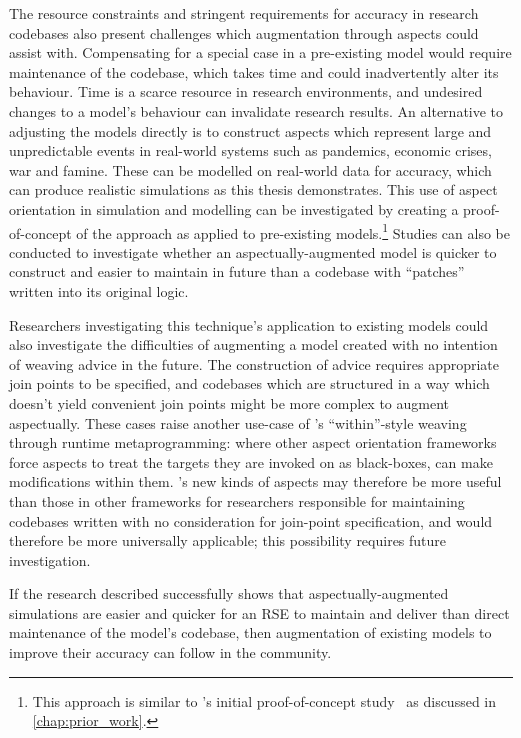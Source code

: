 The resource constraints and stringent requirements for accuracy in research
codebases also present challenges which augmentation through aspects could
assist with. Compensating for a special case in a pre-existing model would
require maintenance of the codebase, which takes time and could inadvertently
alter its behaviour. Time is a scarce resource in research environments, and
undesired changes to a model's behaviour can invalidate research results. An
alternative to adjusting the models directly is to construct aspects which
represent large and unpredictable events in real-world systems such as
pandemics, economic crises, war and famine. These can be modelled on real-world
data for accuracy, which can produce realistic simulations as this thesis
demonstrates. This use of aspect orientation in simulation and modelling can be
investigated by creating a proof-of-concept of the approach as applied to
pre-existing models.\footnote{This approach is similar to \pdsf{}'s initial
proof-of-concept study~\cite{wallis2018caise} as discussed in
\cref{chap:prior_work}.} Studies can also be conducted to investigate
whether an aspectually-augmented model is quicker to construct and easier to
maintain in future than a codebase with ``patches'' written into its original
logic.

Researchers investigating this technique's application to existing models could
also investigate the difficulties of augmenting a model created with no
intention of weaving advice in the future. The construction of advice requires
appropriate join points to be specified, and codebases which are structured in a
way which doesn't yield convenient join points might be more complex to augment
aspectually. These cases raise another use-case of \pdsf{}'s ``within''-style
weaving through runtime metaprogramming: where other aspect orientation
frameworks force aspects to treat the targets they are invoked on as
black-boxes, \pdsf can make modifications within them. \pdsf{}'s new kinds of
aspects may therefore be more useful than those in other frameworks for
researchers responsible for maintaining codebases written with no consideration
for join-point specification, and would therefore be more universally
applicable; this possibility requires future investigation.

If the research described successfully shows that aspectually-augmented
simulations are easier and quicker for an RSE to maintain and deliver than
direct maintenance of the model's codebase, then augmentation of existing models
to improve their accuracy can follow in the community.
    








